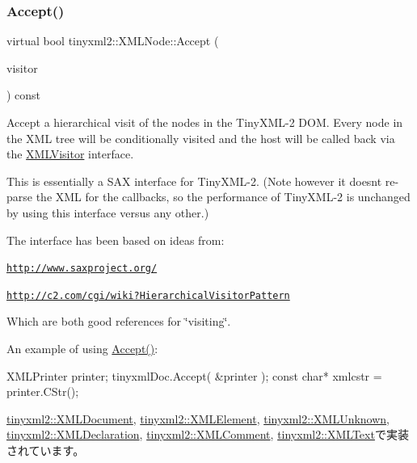 \subsubsection{\texorpdfstring{Accept()}{Accept()}}
{\footnotesize\ttfamily virtual bool tinyxml2\+::\+X\+M\+L\+Node\+::\+Accept (\begin{DoxyParamCaption}\item[{\hyperlink{classtinyxml2_1_1_x_m_l_visitor}{X\+M\+L\+Visitor} $\ast$}]{visitor }\end{DoxyParamCaption}) const\hspace{0.3cm}{\ttfamily [pure virtual]}}

Accept a hierarchical visit of the nodes in the Tiny\+X\+M\+L-\/2 D\+OM. Every node in the X\+ML tree will be conditionally visited and the host will be called back via the \hyperlink{classtinyxml2_1_1_x_m_l_visitor}{X\+M\+L\+Visitor} interface.

This is essentially a S\+AX interface for Tiny\+X\+M\+L-\/2. (Note however it doesn\textquotesingle{}t re-\/parse the X\+ML for the callbacks, so the performance of Tiny\+X\+M\+L-\/2 is unchanged by using this interface versus any other.)

The interface has been based on ideas from\+:


\begin{DoxyItemize}
\item \href{http://www.saxproject.org/}{\tt http\+://www.\+saxproject.\+org/}
\item \href{http://c2.com/cgi/wiki?HierarchicalVisitorPattern}{\tt http\+://c2.\+com/cgi/wiki?\+Hierarchical\+Visitor\+Pattern}
\end{DoxyItemize}

Which are both good references for \char`\"{}visiting\char`\"{}.

An example of using \hyperlink{classtinyxml2_1_1_x_m_l_node_a81e66df0a44c67a7af17f3b77a152785}{Accept()}\+: \begin{DoxyVerb}XMLPrinter printer;
tinyxmlDoc.Accept( &printer );
const char* xmlcstr = printer.CStr();
\end{DoxyVerb}
 

\hyperlink{classtinyxml2_1_1_x_m_l_document_ab7be651917a35ab1ff0e4e6d4e565cdf}{tinyxml2\+::\+X\+M\+L\+Document}, \hyperlink{classtinyxml2_1_1_x_m_l_element_a9b2119831e8b85827d5d3e5076788e4a}{tinyxml2\+::\+X\+M\+L\+Element}, \hyperlink{classtinyxml2_1_1_x_m_l_unknown_a8a06b8c82117ca969a432e17a46830fc}{tinyxml2\+::\+X\+M\+L\+Unknown}, \hyperlink{classtinyxml2_1_1_x_m_l_declaration_acf47629d9fc08ed6f1c164a97bcf794b}{tinyxml2\+::\+X\+M\+L\+Declaration}, \hyperlink{classtinyxml2_1_1_x_m_l_comment_a27b37d16cea01b5329dfbbb4f9508e39}{tinyxml2\+::\+X\+M\+L\+Comment}, \hyperlink{classtinyxml2_1_1_x_m_l_text_a537c60d7e18fb59c45ac2737a29ac47a}{tinyxml2\+::\+X\+M\+L\+Text}で実装されています。

